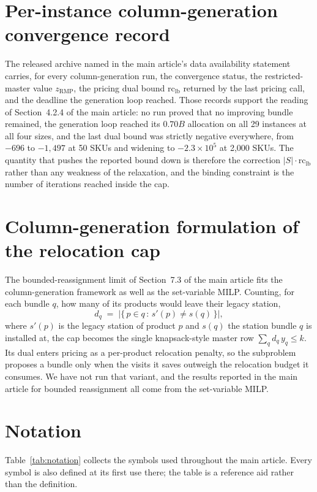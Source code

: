 \documentclass[11pt]{article}
\begin{document}
\section{Per-instance column-generation convergence record}\label{sup:cgrecord}
The released archive named in the main article's data availability statement carries, for every
column-generation run, the convergence status, the restricted-master value $z_{\mathrm{RMP}}$, the
pricing dual bound $\mathrm{rc}_{\mathrm{lb}}$ returned by the last pricing call, and the deadline
the generation loop reached. Those records support the reading of Section~4.2.4 of the main
article: no run proved that no improving bundle remained, the generation loop reached its $0.70B$
allocation on all 29 instances at all four sizes, and the last dual bound was strictly negative
everywhere, from $-696$ to $-1{,}497$ at 50 SKUs and widening to $-2.3\times10^{5}$ at 2,000 SKUs.
The quantity that pushes the reported bound down is therefore the correction
$|S|\cdot\mathrm{rc}_{\mathrm{lb}}$ rather than any weakness of the relaxation, and the binding
constraint is the number of iterations reached inside the cap.

\section{Column-generation formulation of the relocation cap}\label{sup:relocap}
The bounded-reassignment limit of Section~7.3 of the main article fits the column-generation
framework as well as the set-variable MILP. Counting, for each bundle $q$, how many of its products
would leave their legacy station,
\[
d_q \;=\; \bigl|\{\, p \in q \,:\, s'(p) \neq s(q) \,\}\bigr|,
\]
where $s'(p)$ is the legacy station of product $p$ and $s(q)$ the station bundle $q$ is installed
at, the cap becomes the single knapsack-style master row $\sum_q d_q\, y_q \le k$. Its dual enters
pricing as a per-product relocation penalty, so the subproblem proposes a bundle only when the
visits it saves outweigh the relocation budget it consumes. We have not run that variant, and the
results reported in the main article for bounded reassignment all come from the set-variable MILP.

\section{Notation}\label{sup:notation}
Table~\ref{tab:notation} collects the symbols used throughout the main article. Every symbol is
also defined at its first use there; the table is a reference aid rather than the definition.
\end{document}
